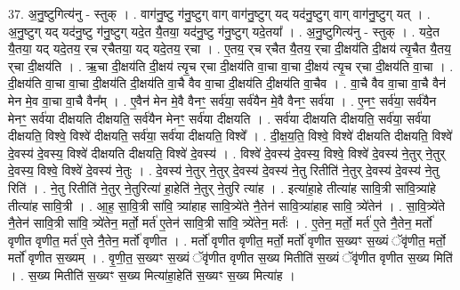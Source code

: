 \documentclass[17pt]{extarticle}
\begin{document}
37. अ॒नु॒ष्टुगित्य॑नु - स्तुक् । . वाग॑नु॒ष्टु ग॑नु॒ष्टुग् वाग् वाग॑नु॒ष्टुग् यद् यद॑नु॒ष्टुग् वाग् वाग॑नु॒ष्टुग् यत् । . अ॒नु॒ष्टुग् यद् यद॑नु॒ष्टु ग॑नु॒ष्टुग् यदे॒त यै॒तया॒ यद॑नु॒ष्टु ग॑नु॒ष्टुग् यदे॒तया᳚ । . अ॒नु॒ष्टुगित्य॑नु - स्तुक् । . यदे॒त यै॒तया॒ यद् यदे॒तय॒ र्‌च र्‌चैतया॒ यद् यदे॒तय॒ र्‌चा । . ए॒तय॒ र्‌च र्‌चैत यै॒तय॒ र्‌चा दी॒क्षय॑ति दी॒क्षय॑ त्यृ॒चैत यै॒तय॒ र्‌चा दी॒क्षय॑ति । . ऋ॒चा दी॒क्षय॑ति दी॒क्षय॑ त्यृ॒च र्‌चा दी॒क्षय॑ति वा॒चा वा॒चा दी॒क्षय॑ त्यृ॒च र्‌चा दी॒क्षय॑ति वा॒चा । . दी॒क्षय॑ति वा॒चा वा॒चा दी॒क्षय॑ति दी॒क्षय॑ति वा॒चै वैव वा॒चा दी॒क्षय॑ति दी॒क्षय॑ति वा॒चैव । . वा॒चै वैव वा॒चा वा॒चै वैन॑ मेन मे॒व वा॒चा वा॒चै वैन᳚म् । . ए॒वैन॑ मेन मे॒वै वैनꣳ॒॒ सर्व॑या॒ सर्व॑यैन मे॒वै वैनꣳ॒॒ सर्व॑या । . ए॒नꣳ॒॒ सर्व॑या॒ सर्व॑यैन मेनꣳ॒॒ सर्व॑या दीक्षयति दीक्षयति॒ सर्व॑यैन मेनꣳ॒॒ सर्व॑या दीक्षयति । . सर्व॑या दीक्षयति दीक्षयति॒ सर्व॑या॒ सर्व॑या दीक्षयति॒ विश्वे॒ विश्वे॑ दीक्षयति॒ सर्व॑या॒ सर्व॑या दीक्षयति॒ विश्वे᳚ । . दी॒क्ष॒य॒ति॒ विश्वे॒ विश्वे॑ दीक्षयति दीक्षयति॒ विश्वे॑ दे॒वस्य॑ दे॒वस्य॒ विश्वे॑ दीक्षयति दीक्षयति॒ विश्वे॑ दे॒वस्य॑ । . विश्वे॑ दे॒वस्य॑ दे॒वस्य॒ विश्वे॒ विश्वे॑ दे॒वस्य॑ ने॒तुर् ने॒तुर् दे॒वस्य॒ विश्वे॒ विश्वे॑ दे॒वस्य॑ ने॒तुः । . दे॒वस्य॑ ने॒तुर् ने॒तुर् दे॒वस्य॑ दे॒वस्य॑ ने॒तु रितीति॑ ने॒तुर् दे॒वस्य॑ दे॒वस्य॑ ने॒तु रिति॑ । . ने॒तु रितीति॑ ने॒तुर् ने॒तुरित्या॑ हा॒हेति॑ ने॒तुर् ने॒तुरि त्या॑ह । . इत्या॑हा॒हे तीत्या॑ह सावि॒त्री सा॑वि॒त्र्या॑हे तीत्या॑ह सावि॒त्री । . आ॒ह॒ सा॒वि॒त्री सा॑वि॒ त्र्या॑हाह सावि॒त्र्ये॑ते नै॒तेन॑ सावि॒त्र्या॑हाह सावि॒ त्र्ये॑तेन॑ । . सा॒वि॒त्र्ये॑ते नै॒तेन॑ सावि॒त्री सा॑वि॒ त्र्ये॑तेन॒ मर्तो॒ मर्त॑ ए॒तेन॑ सावि॒त्री सा॑वि॒ त्र्ये॑तेन॒ मर्तः॑ । . ए॒तेन॒ मर्तो॒ मर्त॑ ए॒ते नै॒तेन॒ मर्तो॑ वृणीत वृणीत॒ मर्त॑ ए॒ते नै॒तेन॒ मर्तो॑ वृणीत । . मर्तो॑ वृणीत वृणीत॒ मर्तो॒ मर्तो॑ वृणीत स॒ख्यꣳ स॒ख्यं ॅवृ॑णीत॒ मर्तो॒ मर्तो॑ वृणीत स॒ख्यम् । . वृ॒णी॒त॒ स॒ख्यꣳ स॒ख्यं ॅवृ॑णीत वृणीत स॒ख्य मितीति॑ स॒ख्यं ॅवृ॑णीत वृणीत स॒ख्य मिति॑ । . स॒ख्य मितीति॑ स॒ख्यꣳ स॒ख्य मित्या॑हा॒हेति॑ स॒ख्यꣳ स॒ख्य मित्या॑ह । \newline
\pagebreak
{}
\end{document}
